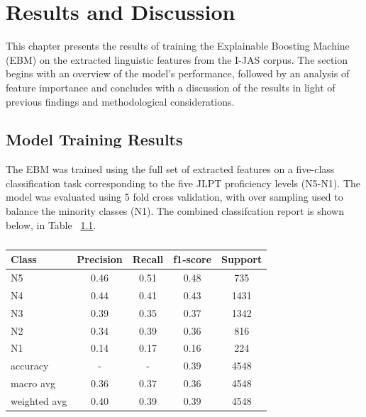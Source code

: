 \chapter{Results and Discussion}
This chapter presents the results of training the Explainable Boosting Machine (EBM) on the extracted linguistic
features from the I-JAS corpus. The section begins with an overview of the model's performance, followed by an
analysis of feature importance and concludes with a discussion of the results in light of previous findings and
methodological considerations.


\section{Model Training Results}

The EBM was trained using the full set of extracted features on a five-class classification task corresponding to
the five JLPT proficiency levels (N5-N1). The model was evaluated using 5 fold cross validation, with over sampling
used to balance the minority classes (N1). The combined classifcation report is shown below, in Table~
\ref{tab:trainingResults}.


\begin{table}[h!]
    \centering
    \begin{tabular}{lcccc}
        \hline \textbf{Class} & \textbf{Precision} & \textbf{Recall} & \textbf{f1-score} & \textbf{Support} \\ \hline
        N5    &   0.46   &   0.51   &   0.48   &    735\\
          N4    &   0.44   &   0.41   &   0.43   &   1431\\
          N3    &   0.39   &   0.35   &   0.37  &    1342\\
          N2  &     0.34   &   0.39  &    0.36   &    816\\
          N1    &   0.14   &   0.17   &   0.16    &   224\\ \hline
        accuracy &   -    &      -    &     0.39  &    4548\\
   macro avg  &     0.36   &   0.37  &    0.36   &   4548\\
weighted avg  &     0.40  &    0.39    &  0.39   &   4548\\ \hline
    \end{tabular}
    \caption[Overall Classification Report (All Folds Combined)]{}
    \label{tab:trainingResults}
\end{table}


